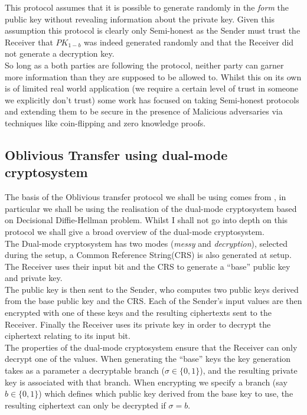 \documentclass[a4paper,11pt]{article}
\begin{document}
				This protocol assumes that it is possible to generate randomly in the \emph{form} the public key without revealing information about the private key. Given this assumption this protocol is clearly only Semi-honest as the Sender must trust the Receiver that $PK_{1-b}$ was indeed generated randomly and that the Receiver did not generate a decryption key.\\

				So long as a both parties are following the protocol, neither party can garner more information than they are supposed to be allowed to. Whilst this on its own is of limited real world application (we require a certain level of trust in someone we explicitly don't trust) some work has focused on taking Semi-honest protocols and extending them to be secure in the presence of Malicious adversaries via techniques like coin-flipping and zero knowledge proofs.
 
		\subsection{Oblivious Transfer using dual-mode cryptosystem} \label{dualModeCryptoOT}
			The basis of the Oblivious transfer protocol we shall be using comes from \cite{PVW_OT_2008}, in particular we shall be using the realisation of the dual-mode cryptosystem based on Decisional Diffie-Hellman problem. Whilst I shall not go into depth on this protocol we shall give a broad overview of the dual-mode cryptosystem.\\

			The Dual-mode cryptosystem has two modes (\emph{messy} and \emph{decryption}), selected during the setup, a Common Reference String(CRS) is also generated at setup. The Receiver uses their input bit and the CRS to generate  a ``base'' public key and private key.\\

			The public key is then sent to the Sender, who computes two public keys derived from the base public key and the CRS. Each of the Sender's input values are then encrypted with one of these keys and the resulting ciphertexts sent to the Receiver. Finally the Receiver uses its private key in order to decrypt the ciphertext relating to its input bit.\\

			The properties of the dual-mode cryptosystem ensure that the Receiver can only decrypt one of the values. When generating the ``base'' keys the key generation takes as a parameter a decryptable branch ($\sigma \in \{0, 1\}$), and the resulting private key is associated with that branch. When encrypting we specify a branch (say $b \in \{0, 1\}$) which defines which public key derived from the base key to use, the resulting ciphertext can only be decrypted if $\sigma = b$.\\
\end{document}
